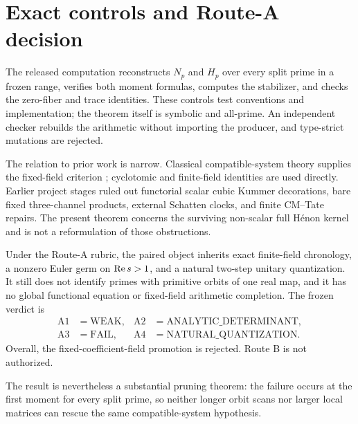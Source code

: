 \section{Exact controls and Route-A decision}

The released computation reconstructs $N_p$ and $H_p$ over every split prime
in a frozen range, verifies both moment formulas, computes the stabilizer, and
checks the zero-fiber and trace identities.  These controls test conventions
and implementation; the theorem itself is symbolic and all-prime.  An
independent checker rebuilds the arithmetic without importing the producer,
and type-strict mutations are rejected.

The relation to prior work is narrow.  Classical compatible-system theory
supplies the fixed-field criterion \cite{Hui2025}; cyclotomic and finite-field
identities are used directly.  Earlier project stages ruled out functorial
scalar cubic Kummer decorations, bare fixed three-channel products, external
Schatten clocks, and finite CM--Tate repairs.  The present theorem concerns the
surviving non-scalar full H\'enon kernel and is not a reformulation of those
obstructions.

Under the Route-A rubric, the paired object inherits exact finite-field
chronology, a nonzero Euler germ on $\operatorname{Re} s>1$, and a natural two-step
unitary quantization.  It still does not identify primes with primitive orbits
of one real map, and it has no global functional equation or fixed-field
arithmetic completion.  The frozen verdict is
\begin{align*}
 \mathrm{A1}&=\mathrm{WEAK},
 &\mathrm{A2}&=\mathrm{ANALYTIC\_DETERMINANT},\\
 \mathrm{A3}&=\mathrm{FAIL},
 &\mathrm{A4}&=\mathrm{NATURAL\_QUANTIZATION}.
\end{align*}
Overall, the fixed-coefficient-field promotion is rejected.  Route B is not
authorized.

The result is nevertheless a substantial pruning theorem: the failure occurs
at the first moment for every split prime, so neither longer orbit scans nor
larger local matrices can rescue the same compatible-system hypothesis.

